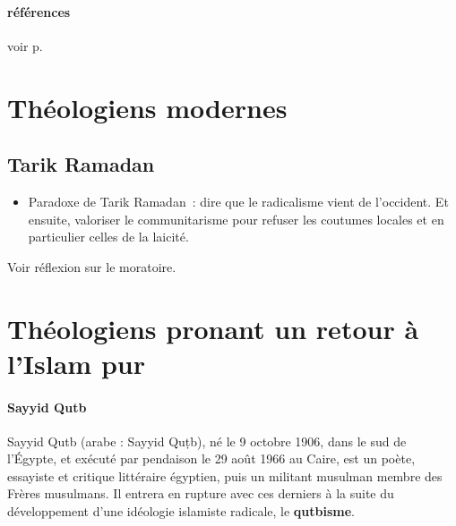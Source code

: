 \paragraph{références}
voir p. 

\section{Théologiens modernes}
\subsection{Tarik Ramadan}
 \begin{itemize}
  \item Paradoxe de Tarik Ramadan~: dire que le radicalisme vient de
    l'occident. Et ensuite, valoriser le communitarisme pour refuser les
    coutumes locales et en particulier celles de la laicité.
  \end{itemize}
  
Voir réflexion sur le moratoire.

\section{Théologiens pronant un retour à l'Islam pur}
\label{theol:SayyidQutb}
\paragraph{Sayyid Qutb}
Sayyid Qutb (arabe : Sayyid Quṭb), né le 9 octobre 1906, dans le sud de l'Égypte, et exécuté par pendaison le 29 août 1966 au Caire, est un poète, essayiste et critique littéraire égyptien, puis un militant musulman membre des Frères musulmans. Il entrera en rupture avec ces derniers à la suite du développement d'une idéologie islamiste radicale, le \textbf{qutbisme}.


